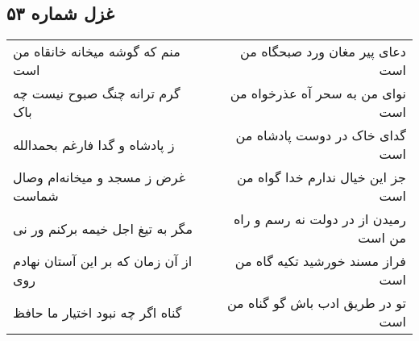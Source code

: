 \begin{center}
\section*{غزل شماره ۵۳}
\label{sec:sh053}
\begin{longtable}{l p{0.5cm} r}
منم که گوشه میخانه خانقاه من است
&&
دعای پیر مغان ورد صبحگاه من است
\\
گرم ترانه چنگ صبوح نیست چه باک
&&
نوای من به سحر آه عذرخواه من است
\\
ز پادشاه و گدا فارغم بحمدالله
&&
گدای خاک در دوست پادشاه من است
\\
غرض ز مسجد و میخانه‌ام وصال شماست
&&
جز این خیال ندارم خدا گواه من است
\\
مگر به تیغ اجل خیمه برکنم ور نی
&&
رمیدن از در دولت نه رسم و راه من است
\\
از آن زمان که بر این آستان نهادم روی
&&
فراز مسند خورشید تکیه گاه من است
\\
گناه اگر چه نبود اختیار ما حافظ
&&
تو در طریق ادب باش گو گناه من است
\\
\end{longtable}
\end{center}
